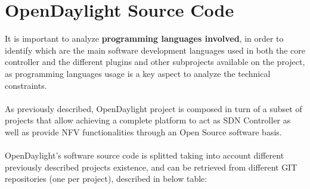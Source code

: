 \documentclass[a4paper, 12pt]{book}
\begin{document}
\section{OpenDaylight Source Code}
\label{chap:odltech_source_code}
It is important to analyze \textbf{programming languages involved}, in order to identify which are the main software development languages used in both the core controller and the different plugins and other subprojects available on the project, as programming languages usage is a key aspect to analyze the technical constraints.\\
\\
As previously described, OpenDaylight project is composed in turn of a subset of projects that allow achieving a complete platform to act as SDN Controller as well as provide NFV functionalities through an Open Source software basis.\\
\\
OpenDaylight's software source code is splitted taking into account different previously described projects existence, and can be retrieved from different GIT repositories (one per project), described in below table:
\end{document}
